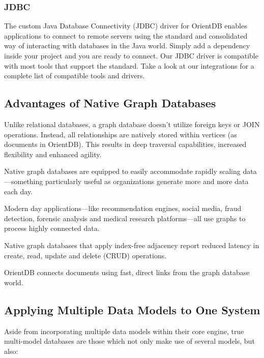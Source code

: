 \documentclass[
	final,
	a4paper,
	oneside,
	parskip=half,
	headings=standardclasses,
	headings=big,
	pointednumbers,
    fleqn
]{scrartcl}
\begin{document}
\begin{multicols*}{2}
            \subsubsection{JDBC}

                The custom Java Database Connectivity (JDBC) driver for OrientDB enables applications to connect to remote servers using the standard and consolidated way of interacting with databases in the Java world. Simply add a dependency inside your project and you are ready to connect.
                Our JDBC driver is compatible with most tools that support the standard. Take a look at our integrations for a complete list of compatible tools and drivers.

        \subsection{Advantages of Native Graph Databases}

            Unlike relational databases, a graph database doesn’t utilize foreign keys or JOIN operations. Instead, all relationships are natively stored within vertices (as documents in OrientDB). This results in deep traversal capabilities, increased flexibility and enhanced agility.
    
            Native graph databases are equipped to easily accommodate rapidly scaling data—something particularly useful as organizations generate more and more data each day.
    
            Modern day applications—like recommendation engines, social media, fraud detection, forensic analysis and medical research platforms—all use graphs to process highly connected data.
    
            Native graph databases that apply index-free adjacency report reduced latency in create, read, update and delete (CRUD) operations.
    
            OrientDB connects documents using fast, direct links from the graph database world.

        \subsection{Applying Multiple Data Models to One System}

            Aside from incorporating multiple data models within their core engine, true multi-model databases are those which not only make use of several models, but also:


\end{multicols*}
\end{document}

